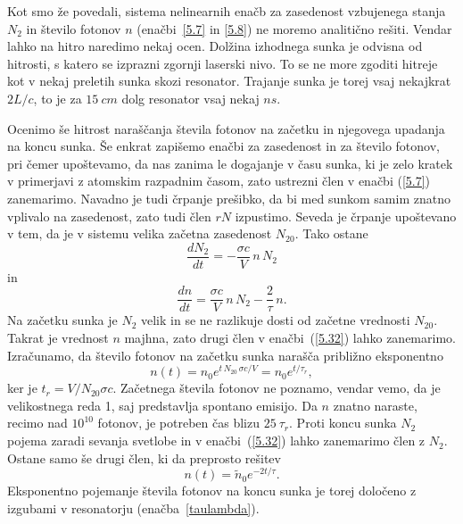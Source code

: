 Kot smo že povedali, sistema nelinearnih enačb za zasedenost vzbujenega stanja $N_2$ 
in število fotonov $n$
(enačbi~\ref{5.7} in \ref{5.8}) ne moremo analitično rešiti. Vendar lahko na hitro
naredimo nekaj ocen. Dolžina izhodnega sunka je odvisna od hitrosti, 
s katero se izprazni zgornji laserski nivo. To se ne more zgoditi
hitreje kot v nekaj preletih sunka skozi resonator. Trajanje sunka je torej
vsaj nekajkrat $2L/c$, to je za $15~\si{cm}$ dolg resonator vsaj nekaj $\si{ns}$.

Ocenimo še hitrost naraščanja števila fotonov na začetku in 
njegovega upadanja na koncu sunka. Še enkrat zapišemo enačbi za zasedenost in za število
fotonov, pri čemer upoštevamo, da nas zanima le dogajanje v času sunka,
ki je zelo kratek v primerjavi z atomskim razpadnim časom, zato 
ustrezni člen v enačbi (\ref{5.7}) zanemarimo. Navadno je tudi črpanje prešibko, da
bi med sunkom samim znatno vplivalo na zasedenost, zato tudi člen $rN$
izpustimo. Seveda je črpanje upoštevano v tem, da je v sistemu velika začetna 
zasedenost $N_{20}$. Tako ostane 
\begin{equation}
 \frac{d N_2}{d t}=-\frac{\sigma c}{V}\,n\,N_2 
 \label{5.32a}
\end{equation}
in 
\begin{equation}
 \frac{d n}{d t}=\frac{\sigma c}{V}\,n\,N_2 - \frac{2}{\tau}\,n.
 \label{5.32}
\end{equation}
Na začetku sunka je $N_2$ velik in se ne razlikuje dosti od začetne vrednosti $N_{20}$. Takrat 
je vrednost  $n$ majhna, zato drugi člen v enačbi~(\ref{5.32}) lahko  
zanemarimo. Izračunamo, da število fotonov
na začetku sunka narašča približno eksponentno
\begin{equation}  
n(t)=n_0e^{t\,N_{20}\,\sigma c/V}= n_0e^{t/\tau_r},
\label{5.33}
\end{equation}
ker je $t_r = V/N_{20} \sigma c$.
Začetnega števila fotonov ne poznamo, vendar vemo, da je velikostnega reda 1,
saj predstavlja spontano emisijo. Da $n$ znatno naraste, recimo nad 
$10^{10}$ fotonov, je potreben čas blizu $25~\tau_r$.
Proti koncu sunka $N_2$ pojema zaradi sevanja svetlobe in v enačbi~(\ref{5.32}) lahko 
zanemarimo člen z $N_2$. Ostane samo še drugi člen, ki da preprosto rešitev
\begin{equation}  
n(t)=\tilde{n}_0e^{-2t/\tau}.
\label{5.33a}
\end{equation}
Eksponentno pojemanje števila fotonov na koncu sunka je torej določeno z izgubami
v resonatorju (enačba~\ref{taulambda}). 

